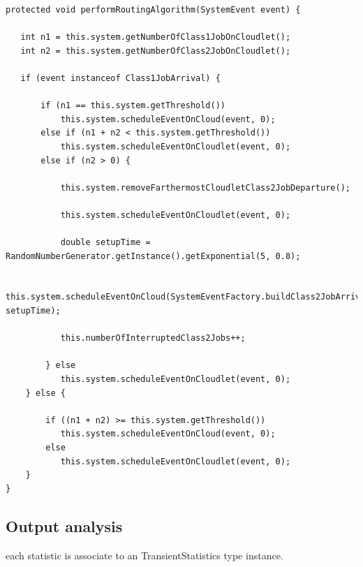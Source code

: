 \documentclass[10pt,a4paper]{article}
\begin{document}
\begin{lstlisting}[frame=lines, caption={\texttt{performRoutingAlgorithm} method implementation concerning access control algorithm 2.},label={code:performRoutingAlgorithm2}]
protected void performRoutingAlgorithm(SystemEvent event) {

   int n1 = this.system.getNumberOfClass1JobOnCloudlet();
   int n2 = this.system.getNumberOfClass2JobOnCloudlet();

   if (event instanceof Class1JobArrival) {

       if (n1 == this.system.getThreshold())
           this.system.scheduleEventOnCloud(event, 0);
       else if (n1 + n2 < this.system.getThreshold())
           this.system.scheduleEventOnCloudlet(event, 0);
       else if (n2 > 0) {

           this.system.removeFarthermostCloudletClass2JobDeparture();

           this.system.scheduleEventOnCloudlet(event, 0);

           double setupTime = RandomNumberGenerator.getInstance().getExponential(5, 0.8);

           this.system.scheduleEventOnCloud(SystemEventFactory.buildClass2JobArrival(), setupTime);

           this.numberOfInterruptedClass2Jobs++;

        } else
           this.system.scheduleEventOnCloudlet(event, 0);
    } else {

        if ((n1 + n2) >= this.system.getThreshold())
           this.system.scheduleEventOnCloud(event, 0);
        else
           this.system.scheduleEventOnCloudlet(event, 0);
    }
}
\end{lstlisting}


\subsection{Output analysis}

each statistic is associate to an TransientStatistics type instance.
\end{document}
